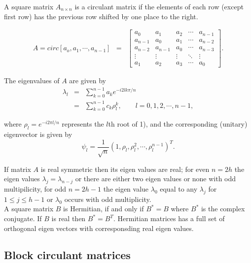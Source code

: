 A square matrix $A_{n\times n}$ is a circulant matrix if the elements of each row (except first row) has the previous row shifted by one place to the right.

\begin{eqnarray}
	A = circ[a_o, a_1,\cdots,a_{n-1}] &=& \left[
		\begin{array}{lllll}
			a_0     & a_1     & a_2    & \cdots & a_{n-1} \\
			a_{n-1} & a_0     & a_1    & \cdots & a_{n-2} \\
			a_{n-2} & a_{n-1} & a_0    & \cdots & a_{n-3} \\
			\vdots  & \vdots  & \vdots & \ddots & \vdots  \\
			a_1     & a_2     & a_3    & \cdots & a_0     
		\end{array}
	\right].
\end{eqnarray}

The eigenvalues of $A$ are given by
\begin{eqnarray*}
	\lambda_l & = & \sum_{k=0}^{n-1} a_k e^{-i2lk\pi/n} \\
	& = & \sum_{k=0}^{n-1}c_k \rho_l^k, \quad \quad l = 0, 1, 2, \cdots, n-1,
\end{eqnarray*}

where $\rho_l = e^{-i2\pi l/n}$ represents the $l$th root of 1), and the corresponding (unitary) eigenvector is given by
\[
	\psi_l = \frac{1}{\sqrt{n}}(1, \rho_l, \rho_l^2, \cdots, \rho_l^{n-1})^T.
\]

If matrix $A$ is real symmetric then its eigen values are real; for even $n=2h$ the eigen values $\lambda_j = \lambda_{n-j}$ or there are either two eigen values or none with odd multipilicity, for odd $n=2h-1$ the eigen value $\lambda_0$ equal to any $\lambda_j$ for $1\le j \le h-1$ or $\lambda_0$ occurs with odd multiplicity.\\

A square matrix $B$ is Hermitian, if and only if $B^* = B$ where $B^*$ is the complex conjugate. If $B$ is real then $B^* = B^T$. Hermitian matrices has a full set of orthogonal eigen vectors with corresponsding real eigen values.    



\subsection{Block circulant matrices}








%
%
